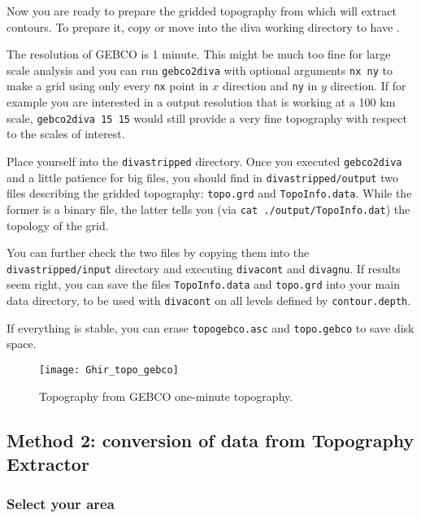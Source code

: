 Now you are ready to prepare the gridded topography  from which \diva will extract contours. To prepare it,
copy or move  into the diva working directory to have .

The resolution of GEBCO is 1 minute. This might be much too fine for large scale analysis and you can run
{\tt gebco2diva} with optional arguments {\tt nx ny} to make a grid using only every {\tt nx} point in $x$ direction and {\tt ny} in $y$ direction. If for example you are interested in a \diva output resolution that is working at a 100 km scale, {\tt gebco2diva 15 15} would still provide a very fine topography with respect to the scales of interest.

Place yourself into the {\tt divastripped} directory. Once you executed {\tt gebco2diva} and a little patience for big files, you should find in {\tt divastripped/output} two files describing the gridded topography: {\tt topo.grd} and {\tt TopoInfo.data}. While the former is a binary file, the latter tells you (via {\tt cat ./output/TopoInfo.dat}) the topology of the grid.


You can further check the two files by copying them into the {\tt divastripped/input} directory and executing {\tt divacont} and {\tt divagnu}. If results seem right, you can save the files {\tt TopoInfo.data} and {\tt topo.grd} into your main data directory, to be used with {\tt divacont} on all levels defined by {\tt contour.depth}.

If everything is stable, you can erase {\tt topogebco.asc} and {\tt topo.gebco} to save disk space. 


\begin{figure}[htpb]
\centering
\texttt{[image: Ghir\_topo\_gebco]}
\caption{Topography from GEBCO one-minute topography.\label{fig:topoGebco3}}
\end{figure}

\subsection{Method 2: conversion of data from Topography Extractor\label{sec:toponavy}}

\subsubsection{Select your area}

